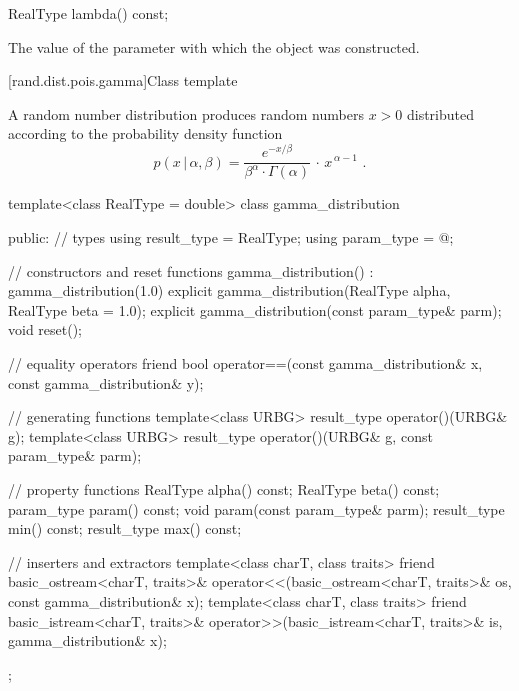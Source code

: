 %
\begin{itemdecl}
RealType lambda() const;
\end{itemdecl}

\begin{itemdescr}
\pnum
\returns
The value of the  parameter
 with which the object was constructed.
\end{itemdescr}


[rand.dist.pois.gamma]{Class template }%
%

\pnum
A  random number distribution
produces random numbers $x > 0$
distributed according to
the probability density function%
\[ p(x\,|\,\alpha,\beta) =
     \frac{e^{-x/\beta}}{\beta^{\alpha} \cdot \Gamma(\alpha)} \, \cdot \, x^{\, \alpha-1}
     \text{ .} \]

%
%
%
\begin{codeblock}
template<class RealType = double>
  class gamma_distribution {
  public:
    // types
    using result_type = RealType;
    using param_type  = @\unspec@;

    // constructors and reset functions
    gamma_distribution() : gamma_distribution(1.0) {}
    explicit gamma_distribution(RealType alpha, RealType beta = 1.0);
    explicit gamma_distribution(const param_type& parm);
    void reset();

    // equality operators
    friend bool operator==(const gamma_distribution& x, const gamma_distribution& y);

    // generating functions
    template<class URBG>
      result_type operator()(URBG& g);
    template<class URBG>
      result_type operator()(URBG& g, const param_type& parm);

    // property functions
    RealType alpha() const;
    RealType beta() const;
    param_type param() const;
    void param(const param_type& parm);
    result_type min() const;
    result_type max() const;

    // inserters and extractors
    template<class charT, class traits>
      friend basic_ostream<charT, traits>&
        operator<<(basic_ostream<charT, traits>& os, const gamma_distribution& x);
    template<class charT, class traits>
      friend basic_istream<charT, traits>&
        operator>>(basic_istream<charT, traits>& is, gamma_distribution& x);
  };
\end{codeblock}

